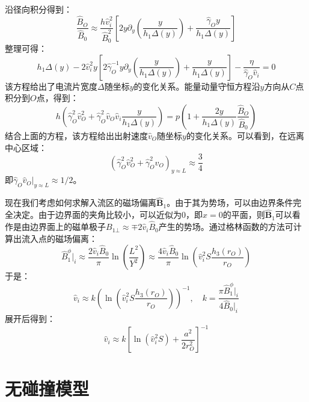 \documentclass[lang=cn,color=blue,cm,11pt,scheme=chinese,bibend=bibtex,sorting=nty]{elegantbook}
\begin{document}
	沿径向积分得到：
	\begin{equation}
		\frac{\hat{B}_O}{\hat{B}_0} \approx \frac{h \hat{v}_i^2}{\hat{B}^2_0} \left[ 2 y \partial_y \left( \frac{y}{h_1 \Delta (y)} \right) + \frac{\hat{\gamma}_O y}{h_1 \Delta (y)} \right]
	\end{equation}
	整理可得：
	\begin{equation}
		h_1 \Delta (y) - 2 \hat{v}^2_i y \left[ 2 \hat{\gamma}_O^{- 1} y \partial_y \left( \frac{y}{h_1 \Delta (y)} \right) + \frac{y}{h_1 \Delta (y)} \right] - \frac{\eta}{\hat{\gamma}_O \hat{v}_i} = 0
	\end{equation}
	该方程给出了电流片宽度$\Delta$随坐标$y$的变化关系。能量动量守恒方程沿$y$方向从$C$点积分到$O$点，得到：
	\begin{equation}
		h \left( \hat{\gamma}^2_O \hat{v}_O^2 + \hat{\gamma}^2_O \hat{v}_O \hat{v}_i \frac{y}{h_1 \Delta (y)} \right) = p \left( 1 + \frac{2 y}{h_1 \Delta (y)} \frac{\hat{B}_O}{\hat{B}_0} \right)
	\end{equation}
	结合上面的方程，该方程给出出射速度$\hat{v}_O$随坐标$y$的变化关系。可以看到，在远离中心区域：
	\begin{equation}
		(\hat{\gamma}^2_O \hat{v}_O^2 + \hat{\gamma}^2_O \hat{v}_O)_{y \approx L} \approx \frac{3}{4}
	\end{equation}
	即$\hat{\gamma}_O \hat{v}_O |_{y \approx L} \approx 1 / 2$。
	
	现在我们考虑如何求解入流区的磁场偏离$\hat{\bm{B}}_1$。由于其为势场，可以由边界条件完全决定。由于边界面的夹角比较小，可以近似为0，即$x=0$的平面，则$\hat{\bm{B}}_1$可以看作是由边界面上的磁单极子$B_{1 \bot} \approx \mp 2 \hat{v}_i \hat{B}_0$产生的势场。通过格林函数的方法可计算出流入点的磁场偏离：
	\begin{equation}
		\hat{B}_1^{\phi} |_i \approx \frac{2 \hat{v}_i \hat{B}_0}{\pi} \ln \left( \frac{L^2}{Y^2} \right) \approx \frac{4 \hat{v}_i \hat{B}_0}{\pi} \ln \left( \hat{v}_i^2 S \frac{h_3 (r_O)}{r_O} \right)
	\end{equation}
	于是：
	\begin{equation}
		\hat{v}_i \approx k \left( \ln \left( \hat{v}_i^2 S \frac{h_3 (r_O)}{r_O} \right) \right)^{- 1}, \quad k = \frac{\pi \hat{B}^{\phi}_1 |_i}{4 \hat{B}_0 |_i}
	\end{equation}
	展开后得到：
	\begin{equation}
		\hat{v}_i \approx k \left[ \ln (\hat{v}_i^2 S) + \frac{a^2}{2 r^2_O} \right]^{- 1}
	\end{equation}
	
	\section{无碰撞模型}
	
\end{document}
